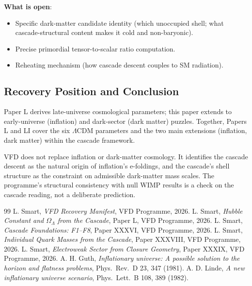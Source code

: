 \documentclass[12pt]{article}
\theoremstyle{remark}
\begin{document}
\textbf{What is open}:
\begin{itemize}
\item Specific dark-matter candidate identity (which unoccupied shell; what cascade-structural content makes it cold and non-baryonic).
\item Precise primordial tensor-to-scalar ratio computation.
\item Reheating mechanism (how cascade descent couples to SM radiation).
\end{itemize}

\subsection{Recovery Position and Conclusion}

Paper L derives late-universe cosmological parameters; this paper extends to early-universe (inflation) and dark-sector (dark matter) puzzles. Together, Papers L and LI cover the six $\Lambda$CDM parameters and the two main extensions (inflation, dark matter) within the cascade framework.

VFD does not replace inflation or dark-matter cosmology. It identifies the cascade descent as the natural origin of inflation's e-foldings, and the cascade's shell structure as the constraint on admissible dark-matter mass scales. The programme's structural consistency with null WIMP results is a check on the cascade reading, not a deliberate prediction.


\begin{thebibliography}{99}
 L. Smart, \emph{VFD Recovery Manifest}, VFD Programme, 2026.
 L. Smart, \emph{Hubble Constant and $\Omega_\Lambda$ from the Cascade}, Paper L, VFD Programme, 2026.
 L. Smart, \emph{Cascade Foundations: F1--F8}, Paper XXXVI, VFD Programme, 2026.
 L. Smart, \emph{Individual Quark Masses from the Cascade}, Paper XXXVIII, VFD Programme, 2026.
 L. Smart, \emph{Electroweak Sector from Closure Geometry}, Paper XXXIX, VFD Programme, 2026.
 A. H. Guth, \emph{Inflationary universe: A possible solution to the horizon and flatness problems}, Phys.\ Rev.\ D 23, 347 (1981).
 A. D. Linde, \emph{A new inflationary universe scenario}, Phys.\ Lett.\ B 108, 389 (1982).
\end{thebibliography}
\end{document}
